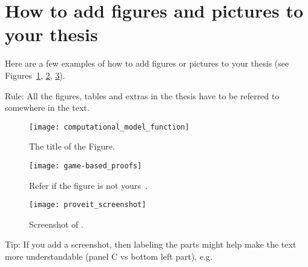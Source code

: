 \section{How to add figures and pictures to your thesis}


Here are a few examples of how to add figures or pictures to your thesis (see Figures~\ref{fig:fnCompModel}, \ref{fig:game-based_proofs}, \ref{fig:proveit_screenshot}).

Rule: All the figures, tables and extras in the thesis have to be referred to somewhere in the text.


\begin{figure} [ht] %
\begin{center}
\texttt{[image: computational\_model\_function]}
\caption{The title of the Figure.}
\label{fig:fnCompModel}
\end{center}
\end{figure}



\begin{figure} [!ht] %
\begin{center}
\texttt{[image: game-based\_proofs]}
\caption{Refer if the figure is not yours~\cite{kamm12}.}
\label{fig:game-based_proofs}
\end{center}
\end{figure}


\begin{figure} [p]
\begin{center}
\texttt{[image: proveit\_screenshot]}
\caption{Screenshot of \proveit.}
\label{fig:proveit_screenshot}
\end{center}
\end{figure}

Tip: If you add a screenshot, then labeling the parts might help make the text more understandable (panel C vs bottom left part), e.g.


